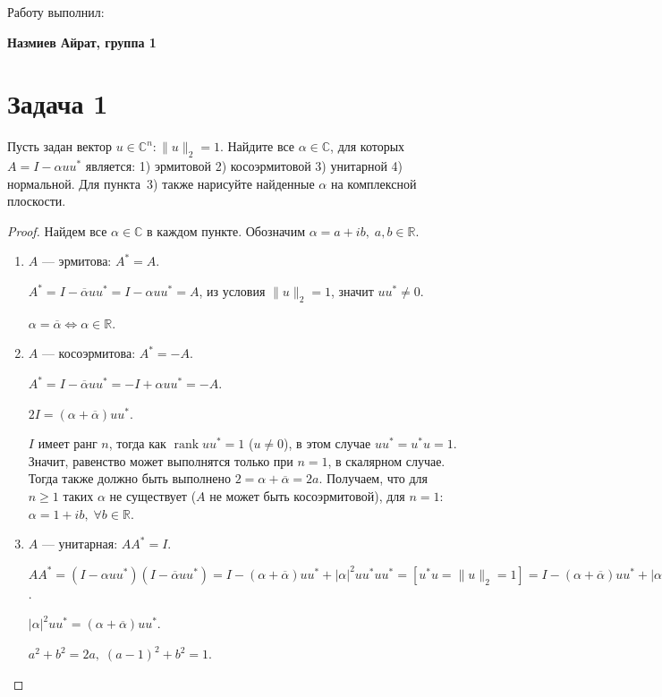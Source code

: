 \documentclass{article}
\newcommand{\rank}{\operatorname{rank}}
\newtheorem*{proof}{$\square$}
\newcommand{\conj}[1]{\overline{#1}}
\newcommand{\R}{\mathbb{R}}
\renewcommand{\geq}{\geqslant}
\begin{document}
	\begin{center}
		Работу выполнил:
		
		\textbf{Назмиев Айрат, группа 1}
	\end{center}
	
	\section*{Задача 1}
	
	Пусть задан вектор $u\in\mathbb{C}^n\colon \|u\|_2=1$. Найдите все $\alpha \in \mathbb{C}$, для которых $A = I - \alpha u u^*$ является: 1) эрмитовой 2) косоэрмитовой 3) унитарной 4) нормальной. Для пункта~{3)} также нарисуйте найденные $\alpha$ на комплексной плоскости.
	
	\begin{proof} Найдем все $\alpha \in \mathbb{C}$ в каждом пункте. Обозначим $\alpha = a + ib,\;a,b\in\R$.
		\begin{enumerate}
			\item 
			$A$ --- эрмитова: $A^* = A$.
			
			$A^* = I - \conj\alpha u u^* = I - \alpha u u^* = A$, из условия $\|u\|_2=1$, значит $u u^*\neq 0$.
			
			$\alpha = \conj{\alpha} \iff \alpha \in \mathbb{R}$.
			
			\item
			$A$ --- косоэрмитова: $A^* = -A$.
			
			$A^* = I - \conj{\alpha} u u^* = -I + \alpha u u^* = -A$.
			
			$2I = (\alpha + \conj\alpha) u u^*$.
			
			$I$ имеет ранг $n$, тогда как $\rank{u u^*} = 1$ ($u \neq 0$), в этом случае $u u^* = u^* u = 1$. Значит, равенство может выполнятся только при $n=1$, в скалярном случае. Тогда также должно быть выполнено $2 = \alpha + \conj\alpha = 2a$. Получаем, что для $n\geq 1$ таких $\alpha$ не существует ($A$ не может быть косоэрмитовой), для $n=1$: $\alpha = 1 + ib,\;\forall b\in \R$.
			
			
			\item 
			$A$ --- унитарная: $A A^* = I$.
			
			$A A^* = (I -\alpha u u^*)(I -\conj\alpha u u^*) = I - (\alpha + \conj\alpha) u u^* + |\alpha|^2 u u^* u u^* = [u^* u = \|u\|_2 = 1] = I - (\alpha + \conj\alpha) u u^* + |\alpha|^2 u u^* = I$.
			
			$|\alpha|^2 u u^* = (\alpha + \conj\alpha) u u^*$.
			
			$a^2 + b^2 = 2a,\; (a-1)^2 + b^2 = 1$.
			

\end{enumerate}
\end{proof}
\end{document}
